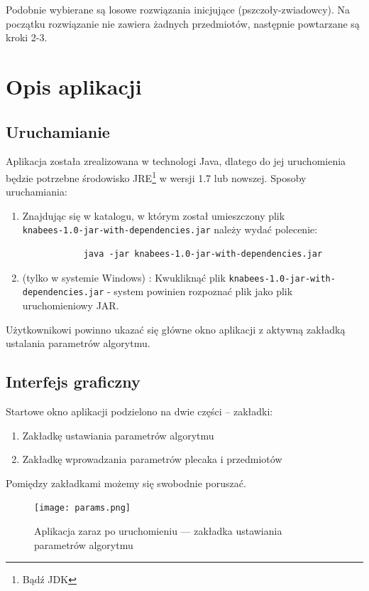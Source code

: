\documentclass[a4paper,12pt,notitlepage]{mwrep}
\begin{document}
Podobnie wybierane są losowe rozwiązania inicjujące (pszczoły-zwiadowcy).
Na początku rozwiązanie nie zawiera żadnych przedmiotów, następnie powtarzane są kroki 2-3.

\chapter{Opis aplikacji}
\section{Uruchamianie}
Aplikacja została zrealizowana w technologi Java, dlatego do jej uruchomienia będzie
potrzebne środowisko JRE\footnote{Bądź JDK} w wersji 1.7 lub nowszej.
Sposoby uruchamiania:
\begin{enumerate}
	\item	Znajdując się w katalogu, w którym został umieszczony plik \\ \texttt{knabees-1.0-jar-with-dependencies.jar}
			należy wydać polecenie:
			\begin{verbatim}
			java -jar knabees-1.0-jar-with-dependencies.jar
			\end{verbatim}
	\item	(tylko w systemie Windows) : Kwukliknąć plik \texttt{knabees-1.0-jar-with-dependencies.jar}
			- system powinien rozpoznać plik jako plik uruchomieniowy JAR.
\end{enumerate}
Użytkownikowi powinno ukazać się główne okno aplikacji z aktywną zakładką ustalania parametrów
algorytmu.

\section{Interfejs graficzny}
Startowe okno aplikacji podzielono na dwie części -- zakładki:
\begin{enumerate}
	\item	Zakładkę ustawiania parametrów algorytmu
	\item	Zakładkę wprowadzania parametrów plecaka i przedmiotów
\end{enumerate}
Pomiędzy zakładkami możemy się swobodnie poruszać.
\begin{figure}[H]
\centering
\texttt{[image: params.png]}
\caption{Aplikacja zaraz po uruchomieniu --- zakładka ustawiania parametrów algorytmu}
\label{fig:params}
\end{figure}
\end{document}
